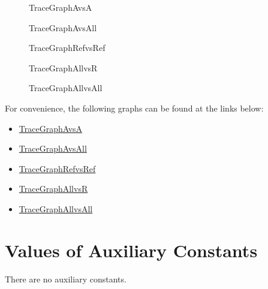 \documentclass[12pt]{article}
\begin{document}
\begin{figure}[H]
\begin{center}

\caption{TraceGraphAvsA}
\label{Figure:TraceGraphAvsA}
\end{center}
\end{figure}
\begin{figure}[H]
\begin{center}

\caption{TraceGraphAvsAll}
\label{Figure:TraceGraphAvsAll}
\end{center}
\end{figure}
\begin{figure}[H]
\begin{center}

\caption{TraceGraphRefvsRef}
\label{Figure:TraceGraphRefvsRef}
\end{center}
\end{figure}
\begin{figure}[H]
\begin{center}

\caption{TraceGraphAllvsR}
\label{Figure:TraceGraphAllvsR}
\end{center}
\end{figure}
\begin{figure}[H]
\begin{center}

\caption{TraceGraphAllvsAll}
\label{Figure:TraceGraphAllvsAll}
\end{center}
\end{figure}
For convenience, the following graphs can be found at the links below:

\begin{itemize}
\item{\hyperref{../../TraceyGraph/avsa.svg}{}{}{TraceGraphAvsA}}
\item{\hyperref{../../TraceyGraph/avsall.svg}{}{}{TraceGraphAvsAll}}
\item{\hyperref{../../TraceyGraph/refvsref.svg}{}{}{TraceGraphRefvsRef}}
\item{\hyperref{../../TraceyGraph/allvsr.svg}{}{}{TraceGraphAllvsR}}
\item{\hyperref{../../TraceyGraph/allvsall.svg}{}{}{TraceGraphAllvsAll}}
\end{itemize}
\section{Values of Auxiliary Constants}
\label{Sec:AuxConstants}
There are no auxiliary constants.
\end{document}
